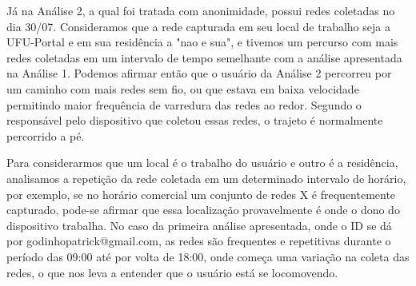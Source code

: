 \documentclass[12pt, %
openright, 
oneside,
a4paper,
brazil]{facom-ufu-abntex2}
\begin{document}
 Já na Análise 2, a qual foi tratada com anonimidade, possui redes coletadas no dia 30/07. Consideramos que a rede capturada em seu local de trabalho seja a UFU-Portal e em sua residência a "nao e sua", e tivemos um percurso com mais redes coletadas em um intervalo de tempo semelhante com a análise apresentada na Análise 1. Podemos afirmar então que o usuário da Análise 2 percorreu por um caminho com mais redes sem fio, ou que estava em baixa velocidade permitindo maior frequência de varredura das redes ao redor. Segundo o responsável pelo dispositivo que coletou essas redes, o trajeto é normalmente percorrido a pé.


Para considerarmos que um local é o trabalho do usuário e outro é a residência, analisamos a repetição da rede coletada em um determinado intervalo de horário, por exemplo, se no horário comercial um conjunto de redes X é frequentemente capturado, pode-se afirmar que essa localização provavelmente é onde o dono do dispositivo trabalha. No caso da primeira análise apresentada, onde o ID se dá por godinhopatrick@gmail.com, as redes são frequentes e repetitivas durante o período das 09:00 até por volta de 18:00, onde começa uma variação na coleta das redes, o que nos leva a entender que o usuário está se locomovendo.
\end{document}
